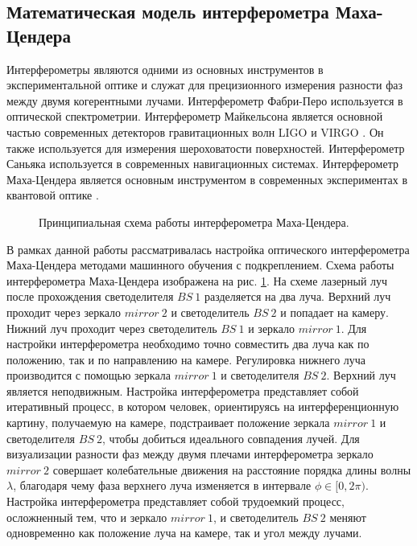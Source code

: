 \subsection{Математическая модель интерферометра Маха-Цендера}\label{sec:ch2/sec1/subsec2}

Интерферометры являются одними из основных инструментов в экспериментальной оптике и служат для прецизионного измерения разности фаз между двумя когерентными лучами.  Интерферометр Фабри-Перо\cite{fabry-perot1899} используется в оптической спектрометрии. Интерферометр Майкельсона является основной частью современных детекторов гравитационных волн LIGO и VIRGO \cite{LIGO, VIRGO}. Он также используется для измерения шероховатости поверхностей. Интерферометр Саньяка используется в современных навигационных системах. Интерферометр Маха-Цендера является основным инструментом в современных экспериментах в квантовой оптике \cite{Sarkar2006, Sychev2017}. 

\begin{figure}[ht]
\caption{Принципиальная схема работы интерферометра Маха-Цендера.}
\label{fig:MZI}
\end{figure}

В рамках данной работы рассматривалась настройка оптического интерферометра Маха-Цендера методами машинного обучения с подкреплением. Схема работы интерферометра Маха-Цендера изображена на рис. \ref{fig:MZI}. На схеме лазерный луч после прохождения светоделителя $BS\ 1$ разделяется на два луча. Верхний луч проходит через зеркало $mirror\ 2$ и светоделитель $BS\ 2$ и попадает на камеру. Нижний луч проходит через светоделитель $BS\ 1$ и зеркало $mirror\ 1$. Для настройки интерферометра необходимо точно совместить два луча как по положению, так и по направлению на камере. Регулировка нижнего луча производится с помощью зеркала $mirror\ 1$ и светоделителя $BS\ 2$. Верхний луч является неподвижным. Настройка интерферометра представляет собой итеративный процесс, в котором человек, ориентируясь на интерференционную картину, получаемую на камере, подстраивает положение зеркала $mirror\ 1$ и светоделителя $BS\ 2$, чтобы добиться идеального совпадения лучей. Для визуализации разности фаз между двумя плечами интерферометра зеркало $mirror\ 2$ совершает колебательные движения на расстояние порядка длины волны $\lambda$, благодаря чему фаза верхнего луча изменяется в интервале $\phi \in [0, 2\pi)$. Настройка интерферометра представляет собой трудоемкий процесс, осложненный тем, что и зеркало $mirror\ 1$, и светоделитель $BS\ 2$ меняют одновременно как положение луча на камере, так и угол между лучами. 

